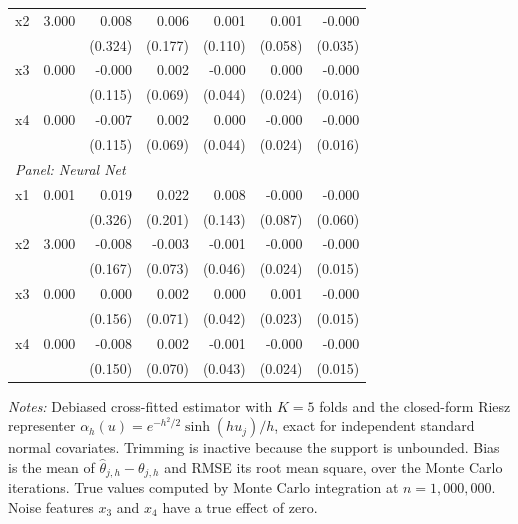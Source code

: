 \begin{table}[htbp]
\begin{threeparttable}
\begin{tabular}{lrrrrrr}
\quad x2 & 3.000 & 0.008 & 0.006 & 0.001 & 0.001 & -0.000 \\
 &  & (0.324) & (0.177) & (0.110) & (0.058) & (0.035) \\
\quad x3 & 0.000 & -0.000 & 0.002 & -0.000 & 0.000 & -0.000 \\
 &  & (0.115) & (0.069) & (0.044) & (0.024) & (0.016) \\
\quad x4 & 0.000 & -0.007 & 0.002 & 0.000 & -0.000 & -0.000 \\
 &  & (0.115) & (0.069) & (0.044) & (0.024) & (0.016) \\
\midrule
\multicolumn{7}{l}{\textit{Panel: Neural Net}} \\
\quad x1 & 0.001 & 0.019 & 0.022 & 0.008 & -0.000 & -0.000 \\
 &  & (0.326) & (0.201) & (0.143) & (0.087) & (0.060) \\
\quad x2 & 3.000 & -0.008 & -0.003 & -0.001 & -0.000 & -0.000 \\
 &  & (0.167) & (0.073) & (0.046) & (0.024) & (0.015) \\
\quad x3 & 0.000 & 0.000 & 0.002 & 0.000 & 0.001 & -0.000 \\
 &  & (0.156) & (0.071) & (0.042) & (0.023) & (0.015) \\
\quad x4 & 0.000 & -0.008 & 0.002 & -0.001 & -0.000 & -0.000 \\
 &  & (0.150) & (0.070) & (0.043) & (0.024) & (0.015) \\
\bottomrule
\end{tabular}
\begin{tablenotes}
\footnotesize
\item \textit{Notes:} Debiased cross-fitted estimator with $K=5$ folds and the closed-form Riesz representer $\alpha_h(u) = e^{-h^2/2}\sinh(h u_j)/h$, exact for independent standard normal covariates. Trimming is inactive because the support is unbounded. Bias is the mean of $\hat{\theta}_{j,h} - \theta_{j,h}$ and RMSE its root mean square, over the Monte Carlo iterations. True values computed by Monte Carlo integration at $n=1{,}000{,}000$. Noise features $x_3$ and $x_4$ have a true effect of zero.
\end{tablenotes}
\end{threeparttable}
\end{table}